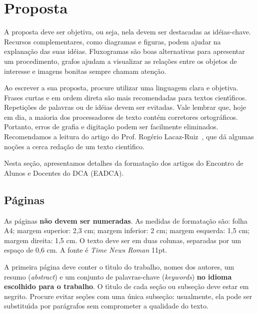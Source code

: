 \documentclass[11pt]{article}
\begin{document}
  \section{Proposta}
  \label{sec:detalhes}

  A proposta deve ser objetiva, ou seja, nela devem ser destacadas as
  id\'{e}ias-chave.  Recursos complementares, como diagramas e figuras,
  podem ajudar na explana\c{c}\~{a}o das suas id\'{e}ias.  Fluxogramas s\~{a}o boas
  alternativas para apresentar um procedimento, grafos ajudam a
  visualizar as rela\c{c}\~{o}es entre os objetos de interesse e imagens
  bonitas sempre chamam aten\c{c}\~{a}o.

   Ao escrever a sua proposta, procure utilizar uma linguagem clara e
   objetiva. Frases curtas e em ordem direta s\~{a}o mais recomendadas
   para textos cient\'{\i}ficos. Repeti\c{c}\~{o}es de palavras ou de id\'{e}ias devem
   ser evitadas. Vale lembrar que, hoje em dia, a maioria dos
   processadores de texto cont\'{e}m corretores ortogr\'{a}ficos. Portanto,
   erros de grafia e digita\c{c}\~{a}o podem ser facilmente
   eliminados. Recomendamos a leitura do artigo do Prof. Rog\'{e}rio
   Lacaz-Ruiz~\cite{LR}, que d\'{a} algumas no\c{c}\~{o}es a cerca reda\c{c}\~{a}o de um texto
   cient\'{\i}fico.

  Nesta se\c{c}\~{a}o, apresentamos detalhes da formata\c{c}\~{a}o dos artigos do
  Encontro de Alunos e Docentes do DCA (EADCA).


\subsection{P\'{a}ginas}
\label{sec:paginas}

As p\'{a}ginas {\bf n\~{a}o devem ser numeradas}. As medidas de formata\c{c}\~{a}o
s\~{a}o: folha A4; margem superior: 2,3 cm; margem inferior: 2 cm;
margem esquerda: 1,5 cm; margem direita: 1,5 cm. O texto deve ser em
duas colunas, separadas por um espa\c{c}o de 0,6 cm. A fonte \'{e} {\it Time
News Roman\/} 11pt.

A primeira p\'{a}gina deve conter o t\'{\i}tulo do trabalho, nomes dos autores, um resumo ({\it abstract}) e um conjunto de
palavras-chave ({\it keywords}) \textbf{no idioma escolhido para o trabalho}. O t\'{\i}tulo de cada se\c{c}\~{a}o ou subse\c{c}\~{a}o deve
estar em negrito. Procure evitar se\c{c}\~{o}es com uma \'{u}nica
subse\c{c}\~{a}o: usualmente, ela pode ser substitu\'{\i}da por par\'{a}grafos sem comprometer a qualidade do texto.
\end{document}
